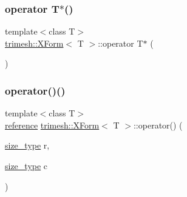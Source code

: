\mbox{\label{classtrimesh_1_1XForm_ab856fb81a44b1c58a02f1787873aaa12}} 
\subsubsection{\texorpdfstring{operator T$\ast$()}{operator T*()}}
{\footnotesize\ttfamily template$<$class T$>$ \\
\hyperlink{classtrimesh_1_1XForm}{trimesh\+::\+X\+Form}$<$ T $>$\+::operator T$\ast$ (\begin{DoxyParamCaption}{ }\end{DoxyParamCaption})\hspace{0.3cm}{\ttfamily [inline]}}

\mbox{\label{classtrimesh_1_1XForm_af28494574b8e85fce45971e16d85f9fa}} 
\subsubsection{\texorpdfstring{operator()()}{operator()()}\hspace{0.1cm}{\footnotesize\ttfamily [1/4]}}
{\footnotesize\ttfamily template$<$class T$>$ \\
\hyperlink{classtrimesh_1_1XForm_afef5285ff7d9ea2e25a4bb4d966bd674}{reference} \hyperlink{classtrimesh_1_1XForm}{trimesh\+::\+X\+Form}$<$ T $>$\+::operator() (\begin{DoxyParamCaption}\item[{\hyperlink{classtrimesh_1_1XForm_aa219f141417c9026a74dec8b6279d4bf}{size\+\_\+type}}]{r,  }\item[{\hyperlink{classtrimesh_1_1XForm_aa219f141417c9026a74dec8b6279d4bf}{size\+\_\+type}}]{c }\end{DoxyParamCaption})\hspace{0.3cm}{\ttfamily [inline]}}

\mbox{\label{classtrimesh_1_1XForm_a20cdf49d77caf2401ca4707491db0f15}} 
